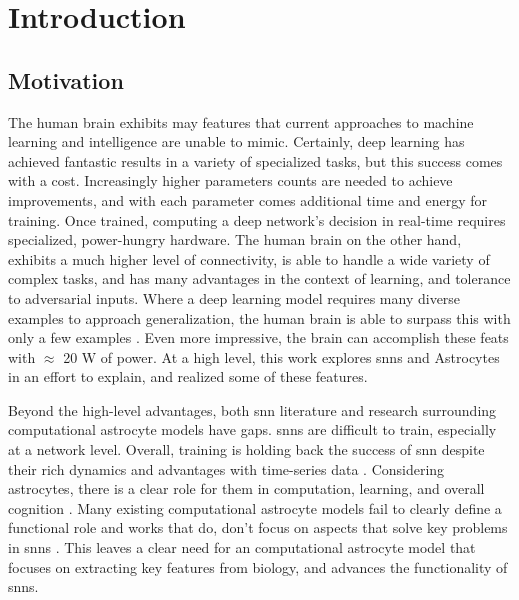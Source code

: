 %
%
%
%
%


\chapter{Introduction}\label{section:introduction}
\section{Motivation}

The human brain exhibits may features that current approaches to machine
learning and intelligence are unable to mimic. Certainly, deep learning has
achieved fantastic results in a variety of specialized tasks, but this success
comes with a cost. Increasingly higher parameters counts are needed to
achieve improvements, and with each parameter comes additional time and energy
for training. Once trained, computing a deep network's decision in real-time
requires specialized, power-hungry hardware. The human brain on the other hand,
exhibits a much higher level of connectivity, is able to handle a wide variety
of complex tasks, and has many advantages in the context of learning, and
tolerance to adversarial inputs. Where a deep learning model requires many
diverse examples to approach generalization, the human brain is able to
surpass this with only a few examples \cite{tsimenidis_2020}. Even more
impressive, the brain can accomplish these feats with $\approx$ 20 W of
power. At a high level, this work explores \Glspl{snn} and Astrocytes in an
effort to explain, and realized some of these features.

Beyond the high-level advantages, both \gls{snn} literature and research
surrounding computational astrocyte models have gaps. \glspl{snn} are difficult
to train, especially at a network level. Overall, training is holding back
the success of \gls{snn} despite their rich dynamics and advantages with
time-series data \cite{tavanaei_2019}. Considering astrocytes, there is a clear
role for them in computation, learning, and overall cognition
\cite{mederos_2018}. Many existing computational astrocyte models fail to clearly
define a functional role and works that do, don't focus on aspects that solve key
problems in \glspl{snn} \cite{manninen_2019}. This leaves a clear need for an
computational astrocyte model that focuses on extracting key features from
biology, and advances the functionality of \glspl{snn}.

